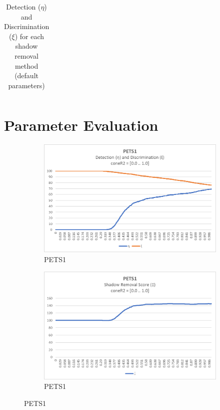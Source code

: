 \begin{appendices}
\begin{table}
\begin{tabular}{ |c|c|c|c|c|c|c|c|c|c|c| }
\hline
\end{tabular}
\caption*{Detection ($\eta$) and Discrimination ($\xi$) for each shadow removal method (default parameters)}
\end{table}

\chapter{Parameter Evaluation}
\clearpage
\FloatBarrier
\begin{figure}
  \begin{subfigure}{.45\linewidth}
  \includegraphics[width=1\linewidth]{figures/appendix/pets1_coneR2_response.jpg}
  \caption{PETS1}
\end{subfigure}
\hfill
\begin{subfigure}{.45\linewidth}
  \includegraphics[width=1\linewidth]{figures/appendix/pets1_coneR2_score.jpg}
  \caption{PETS1}
\end{subfigure}

\end{figure}
\end{appendices}
